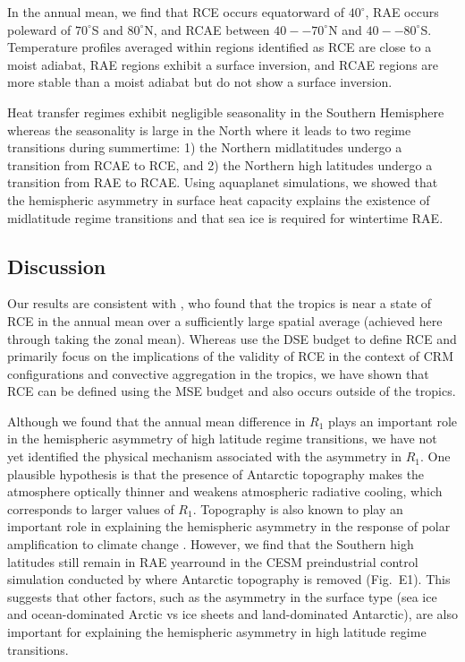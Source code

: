 \documentclass{ametsocV5}
\begin{document}
In the annual mean, we find that RCE occurs equatorward of $40^\circ$, RAE occurs poleward of $70^\circ$S and $80^\circ$N, and RCAE between $40--70^\circ$N and $40--80^\circ$S. Temperature profiles averaged within regions identified as RCE are close to a moist adiabat, RAE regions exhibit a surface inversion, and RCAE regions are more stable than a moist adiabat but do not show a surface inversion.

Heat transfer regimes exhibit negligible seasonality in the Southern Hemisphere whereas the seasonality is large in the North where it leads to two regime transitions during summertime: 1) the Northern midlatitudes undergo a transition from RCAE to RCE, and 2) the Northern high latitudes undergo a transition from RAE to RCAE. Using aquaplanet simulations, we showed that the hemispheric asymmetry in surface heat capacity explains the existence of midlatitude regime transitions and that sea ice is required for wintertime RAE. 

\subsection{Discussion}
Our results are consistent with \cite{jakob2019}, who found that the tropics is near a state of RCE in the annual mean over a sufficiently large spatial average (achieved here through taking the zonal mean). Whereas \cite{jakob2019} use the DSE budget to define RCE and primarily focus on the implications of the validity of RCE in the context of CRM configurations and convective aggregation in the tropics, we have shown that RCE can be defined using the MSE budget and also occurs outside of the tropics.

Although we found that the annual mean difference in $R_1$ plays an important role in the hemispheric asymmetry of high latitude regime transitions, we have not yet identified the physical mechanism associated with the asymmetry in $R_1$. One plausible hypothesis is that the presence of Antarctic topography makes the atmosphere optically thinner and weakens atmospheric radiative cooling, which corresponds to larger values of $R_1$. Topography is also known to play an important role in explaining the hemispheric asymmetry in the response of polar amplification to climate change \citep{salzmann2017,hahn2020,singh2020}. However, we find that the Southern high latitudes still remain in RAE yearround in the CESM preindustrial control simulation conducted by \cite{hahn2020} where Antarctic topography is removed (Fig.~E1). This suggests that other factors, such as the asymmetry in the surface type (sea ice and ocean-dominated Arctic vs ice sheets and land-dominated Antarctic), are also important for explaining the hemispheric asymmetry in high latitude regime transitions.
\end{document}
